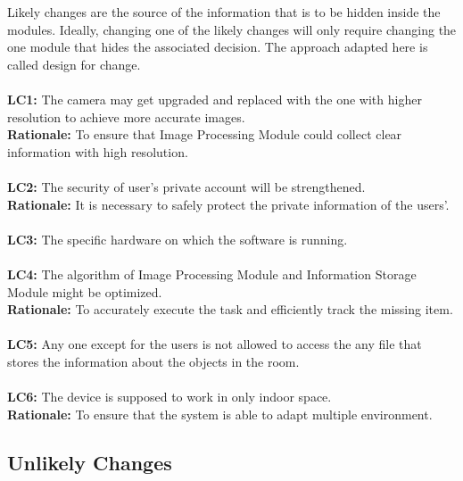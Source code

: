 \documentclass[12pt, titlepage]{article}
\begin{document}
Likely changes are the source of the information that is to be hidden
inside the modules. Ideally, changing one of the likely changes will only
require changing the one module that hides the associated decision. The approach
adapted here is called design for change.\\\\
\textbf{LC1:} The camera may get upgraded and replaced with the one with higher resolution to achieve more accurate images.\\
\textbf{Rationale:} To ensure that Image Processing Module could collect clear information with high resolution.\\\\
\textbf{LC2:} The security of user’s private account will be strengthened. \\
\textbf{Rationale:} It is necessary to safely protect the private information of the users’.\\\\
\textbf{LC3:} The specific
hardware on which the software is running.\\\\
\textbf{LC4:} The algorithm of Image Processing Module and Information Storage Module might be optimized.\\
\textbf{Rationale:} To accurately execute the task and efficiently track the missing item.\\\\
\textbf{LC5:} Any one except for the users is not allowed to access the any file that stores the information about the objects in the room.\\\\
\textbf{LC6:} The device is supposed to work in only indoor space.\\
\textbf{Rationale:} To ensure that the system is able to adapt multiple environment.\\



\subsection{Unlikely Changes}  \label{SecUchange}
\end{document}
